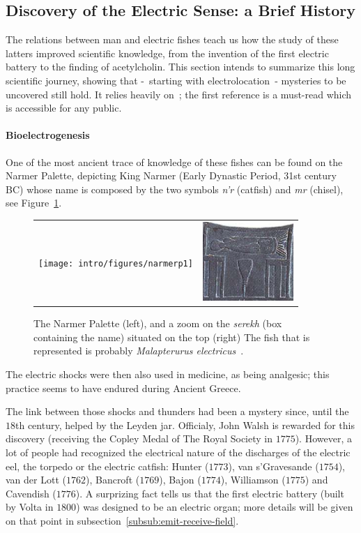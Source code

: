 \subsection{Discovery of the Electric Sense: a Brief History}

The relations between man and electric fishes teach us how the study
of these latters improved scientific knowledge, from the invention
of the first electric battery to the finding of acetylcholin. This
section intends to summarize this long scientific journey, showing
that -~starting with electrolocation~- mysteries to be uncovered
still hold. It relies heavily on~\cite{finger2011shocking,moller1995electric};
the first reference is a must-read which is accessible for any public.

\paragraph{Bioelectrogenesis}
One of the most ancient trace of knowledge of these fishes can be
found on the Narmer Palette, depicting King Narmer (Early Dynastic
Period, 31st century BC) whose name is composed by the two symbols
\emph{n'r} (catfish) and \emph{mr} (chisel), see Figure~\ref{fig:Narmer-Palette}.

\begin{figure}
\centering%
\begin{tabular}{cc}
\texttt{[image: intro/figures/narmerp1]} & \includegraphics[height=3cm]{intro/figures/serekh}\tabularnewline
\end{tabular}
\caption{\label{fig:Narmer-Palette}The Narmer Palette (left), and a zoom on
the \emph{serekh} (box containing the name) situated on the top (right)
The fish that is represented is probably \emph{Malapterurus electricus}~\cite{boulenger1965fishes,howes1985phylogenetic}.}
\end{figure}

The electric shocks were then also used in medicine, as being analgesic; this practice
seems to have endured during Ancient Greece.

The link between those shocks and thunders had been a mystery since, until the
$18$th century, helped by the Leyden jar. Officialy, John Walsh
is rewarded for this discovery (receiving the Copley Medal of The Royal Society
in $1775$). However, a lot of people had recognized the electrical nature of
the discharges of the electric eel, the torpedo or the electric catfish:
Hunter ($1773$), van s'Gravesande ($1754$), van der Lott ($1762$), Bancroft ($1769$),
Bajon ($1774$), Williamson ($1775$) and Cavendish ($1776$). A surprizing fact
tells us that the first electric battery (built by Volta in $1800$) was designed
to be an electric organ; more details will be given on that point in 
subsection~\ref{subsub:emit-receive-field}.

